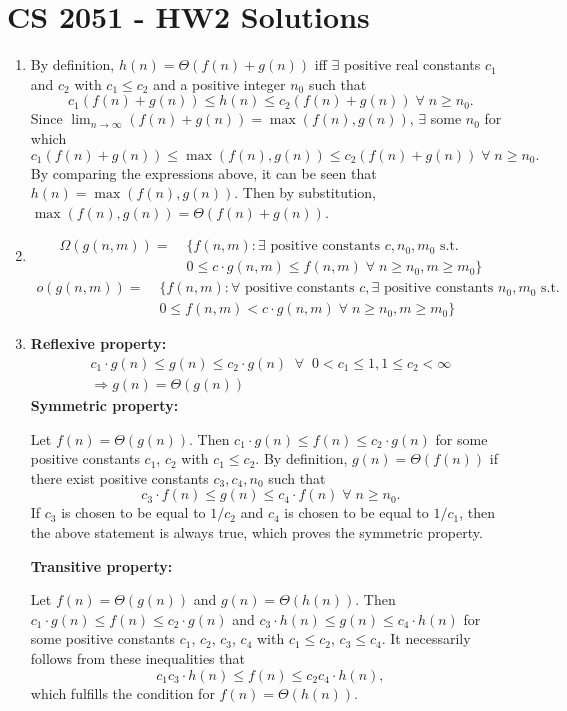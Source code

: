 \documentclass[a4paper,12pt]{article}
\begin{document}
\section*{CS 2051 - HW2 Solutions}

\begin{enumerate}

\item By definition, $h(n)=\Theta(f(n) + g(n))$ iff $\exists$ positive real constants $c_1$ and $c_2$ with $c_1 \leq c_2$ and a positive integer $n_0$ such that
\[ c_1(f(n) + g(n)) \leq h(n) \leq c_2(f(n) + g(n)) \; \forall \; n \geq n_0. \]
Since $\lim_{n \to \infty} (f(n) + g(n)) = \max(f(n), g(n))$, $\exists$ some $n_0$ for which
\[ c_1(f(n) + g(n)) \leq \max(f(n), g(n)) \leq c_2(f(n) + g(n)) \; \forall \; n \geq n_0. \]
By comparing the expressions above, it can be seen that $h(n) = \max(f(n), g(n))$. Then by substitution, $\max(f(n), g(n))=\Theta(f(n) + g(n))$.

\item 
\begin{align*}
\Omega(g(n, m)) = \; &\{f(n, m) : \exists \mbox{ positive constants }c, n_0, m_0 \mbox{ s.t. } \\
&0 \leq c \cdot g(n, m) \leq f(n, m) \; \forall \; n \geq n_0, m \geq m_0\}
\end{align*}
\begin{align*}
o(g(n, m)) = \; &\{f(n, m) : \forall \mbox{ positive constants }c, \exists \mbox{ positive constants } n_0, m_0 \mbox{ s.t. } \\
&0 \leq f(n, m) < c \cdot g(n, m) \; \forall \; n \geq n_0, m \geq m_0\}
\end{align*}

\item \textbf{Reflexive property:}
\begin{gather*}
c_1 \cdot g(n) \leq g(n) \leq c_2 \cdot g(n) \;\; \forall \;\; 0 < c_1 \leq 1, 1 \leq c_2 < \infty \\
\Rightarrow g(n) = \Theta(g(n))
\end{gather*}
\textbf{Symmetric property:} \par
Let $f(n) = \Theta(g(n))$. Then $c_1 \cdot g(n) \leq f(n) \leq c_2 \cdot g(n)$ for some positive constants $c_1$, $c_2$ with $c_1 \leq c_2$. By definition, $g(n) = \Theta(f(n))$ if there exist positive constants $c_3, c_4, n_0$ such that
\[ c_3 \cdot f(n) \leq g(n) \leq c_4 \cdot f(n)\; \forall \; n \geq n_0. \]
If $c_3$ is chosen to be equal to $1/c_2$ and $c_4$ is chosen to be equal to $1/c_1$, then the above statement is always true, which proves the symmetric property. \par
\textbf{Transitive property:} \par
Let $f(n) = \Theta(g(n))$ and $g(n) = \Theta(h(n))$. Then $c_1 \cdot g(n) \leq f(n) \leq c_2 \cdot g(n)$ and $c_3 \cdot h(n) \leq g(n) \leq c_4 \cdot h(n)$ for some positive constants $c_1$, $c_2$, $c_3$, $c_4$ with $c_1 \leq c_2$, $c_3 \leq c_4$. It necessarily follows from these inequalities that
\[ c_1c_3 \cdot h(n) \leq f(n) \leq c_2c_4 \cdot h(n), \]
which fulfills the condition for $f(n) = \Theta(h(n))$.


\end{enumerate}
\end{document}
